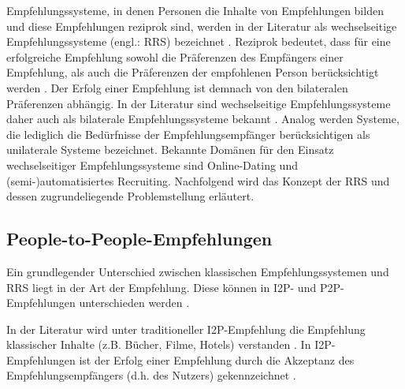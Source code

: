 Empfehlungssysteme, in denen Personen die Inhalte von Empfehlungen bilden und diese Empfehlungen reziprok sind, werden in der Literatur als wechselseitige Empfehlungssysteme (engl.: \ac{RRS}) bezeichnet \cite[S. 2199]{akehurst:inproceedings}\cite[S. 35]{li:inproceedings}\cite[S. 207]{pizzato:2010}.
Reziprok bedeutet, dass für eine erfolgreiche Empfehlung sowohl die Präferenzen des Empfängers einer Empfehlung, als auch die Präferenzen der empfohlenen Person berücksichtigt werden \cite[S. 22]{kleinerman:inproceedings}\cite[S. 447]{pizzato:2013}.
Der Erfolg einer Empfehlung ist demnach von den bilateralen Präferenzen abhängig.
In der Literatur sind wechselseitige Empfehlungssysteme daher auch als bilaterale Empfehlungssysteme bekannt \cite[S. 32]{link:booklet}.
Analog werden Systeme, die lediglich die Bedürfnisse der Empfehlungsempfänger berücksichtigen als unilaterale Systeme bezeichnet.
Bekannte Domänen für den Einsatz wechselseitiger Empfehlungssysteme sind Online-Dating und (semi-)automatisiertes Recruiting.
Nachfolgend wird das Konzept der \ac{RRS} und dessen zugrundeliegende Problemstellung erläutert.

\subsection{People-to-People-Empfehlungen}%
\label{ch:empfehlungssysteme:rrs:people_to_people}
Ein grundlegender Unterschied zwischen klassischen Empfehlungssystemen und \ac{RRS} liegt in der Art der Empfehlung.
Diese können in \ac{I2P}- und \ac{P2P}-Empfehlungen unterschieden werden \cite[S. 62f.]{kim:inproceedings}.

In der Literatur wird unter traditioneller \ac{I2P}-Empfehlung die Empfehlung klassischer Inhalte (z.B. Bücher, Filme, Hotels) verstanden \cite[S. 2199]{akehurst:inproceedings}\cite[S. 2429]{palomares:inproceedings}.
In \ac{I2P}-Empfehlungen ist der Erfolg einer Empfehlung durch die Akzeptanz des Empfehlungsempfängers (d.h. des Nutzers) gekennzeichnet \cite[S. 131]{kleinerman:2:inproceedings}\cite[S. 546]{koprinska:inbook}.

